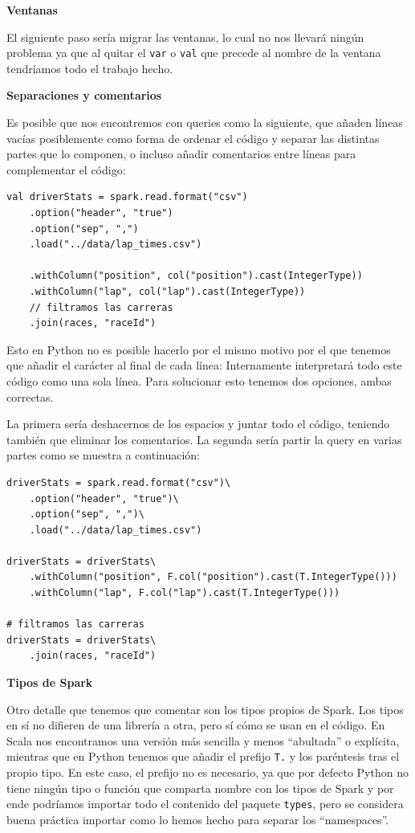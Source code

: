 \documentclass[12pt,twoside,titlepage]{report}
\newcommand{\quotes}[1]{``#1''}
\begin{document}
\textbf{Ventanas}

El siguiente paso sería migrar las ventanas, lo cual no nos llevará ningún problema ya que al quitar el \texttt{var} o \texttt{val} que precede al nombre de la ventana tendríamos todo el trabajo hecho.

\textbf{Separaciones y comentarios}

Es posible que nos encontremos con queries como la siguiente, que añaden líneas vacías posiblemente como forma de ordenar el código y separar las distintas partes que lo componen, o incluso añadir comentarios entre líneas para complementar el código:

\begin{lstlisting}
val driverStats = spark.read.format("csv")
	.option("header", "true")
	.option("sep", ",")
	.load("../data/lap_times.csv")

	.withColumn("position", col("position").cast(IntegerType)) 
	.withColumn("lap", col("lap").cast(IntegerType)) 
	// filtramos las carreras
	.join(races, "raceId")
\end{lstlisting}

Esto en Python no es posible hacerlo por el mismo motivo por el que tenemos que añadir el carácter \texttt{} al final de cada línea: Internamente interpretará todo este código como una sola línea. Para solucionar esto tenemos dos opciones, ambas correctas.

La primera sería deshacernos de los espacios y juntar todo el código, teniendo también que eliminar los comentarios. La segunda sería partir la query en varias partes como se muestra a continuación:

\begin{lstlisting}
driverStats = spark.read.format("csv")\
	.option("header", "true")\
	.option("sep", ",")\
	.load("../data/lap_times.csv")
	
driverStats = driverStats\
	.withColumn("position", F.col("position").cast(T.IntegerType())) 
	.withColumn("lap", F.col("lap").cast(T.IntegerType())) 
	
# filtramos las carreras
driverStats = driverStats\
	.join(races, "raceId")
\end{lstlisting}


\textbf{Tipos de Spark}

Otro detalle que tenemos que comentar son los tipos propios de Spark. Los tipos en sí no difieren de una librería a otra, pero sí cómo se usan en el código. En Scala nos encontramos una versión más sencilla y menos \quotes{abultada} o explícita, mientras que en Python tenemos que añadir el prefijo \texttt{T.} y los paréntesis tras el propio tipo. En este caso, el prefijo no es necesario, ya que por defecto Python no tiene ningún tipo o función que comparta nombre con los tipos de Spark y por ende podríamos importar todo el contenido del paquete \texttt{types}, pero se considera buena práctica importar como lo hemos hecho para separar los \quotes{namespaces}. 
\end{document}
